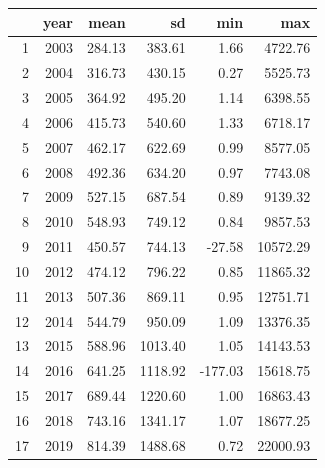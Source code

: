 \documentclass[
]{article}
\begin{document}
\begin{table}[ht]
\centering
\begin{tabular}{rrrrrr}
  \hline
 & year & mean & sd & min & max \\ 
  \hline
1 & 2003 & 284.13 & 383.61 & 1.66 & 4722.76 \\ 
  2 & 2004 & 316.73 & 430.15 & 0.27 & 5525.73 \\ 
  3 & 2005 & 364.92 & 495.20 & 1.14 & 6398.55 \\ 
  4 & 2006 & 415.73 & 540.60 & 1.33 & 6718.17 \\ 
  5 & 2007 & 462.17 & 622.69 & 0.99 & 8577.05 \\ 
  6 & 2008 & 492.36 & 634.20 & 0.97 & 7743.08 \\ 
  7 & 2009 & 527.15 & 687.54 & 0.89 & 9139.32 \\ 
  8 & 2010 & 548.93 & 749.12 & 0.84 & 9857.53 \\ 
  9 & 2011 & 450.57 & 744.13 & -27.58 & 10572.29 \\ 
  10 & 2012 & 474.12 & 796.22 & 0.85 & 11865.32 \\ 
  11 & 2013 & 507.36 & 869.11 & 0.95 & 12751.71 \\ 
  12 & 2014 & 544.79 & 950.09 & 1.09 & 13376.35 \\ 
  13 & 2015 & 588.96 & 1013.40 & 1.05 & 14143.53 \\ 
  14 & 2016 & 641.25 & 1118.92 & -177.03 & 15618.75 \\ 
  15 & 2017 & 689.44 & 1220.60 & 1.00 & 16863.43 \\ 
  16 & 2018 & 743.16 & 1341.17 & 1.07 & 18677.25 \\ 
  17 & 2019 & 814.39 & 1488.68 & 0.72 & 22000.93 \\ 
   \hline
\end{tabular}
\end{table}
\end{document}
